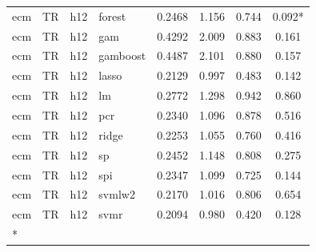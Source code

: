 \begin{ThreePartTable}
\begin{longtable}[t]{llclcccc}
ecm & TR & h12 & forest & 0.2468 & 1.156 & 0.744 & 0.092*\\
ecm & TR & h12 & gam & 0.4292 & 2.009 & 0.883 & 0.161\\
ecm & TR & h12 & gamboost & 0.4487 & 2.101 & 0.880 & 0.157\\
ecm & TR & h12 & lasso & 0.2129 & 0.997 & 0.483 & 0.142\\
ecm & TR & h12 & lm & 0.2772 & 1.298 & 0.942 & 0.860\\
ecm & TR & h12 & pcr & 0.2340 & 1.096 & 0.878 & 0.516\\
ecm & TR & h12 & ridge & 0.2253 & 1.055 & 0.760 & 0.416\\
ecm & TR & h12 & sp & 0.2452 & 1.148 & 0.808 & 0.275\\
ecm & TR & h12 & spi & 0.2347 & 1.099 & 0.725 & 0.144\\
ecm & TR & h12 & svmlw2 & 0.2170 & 1.016 & 0.806 & 0.654\\
ecm & TR & h12 & svmr & 0.2094 & 0.980 & 0.420 & 0.128\\*
\end{longtable}
\end{ThreePartTable}
\endgroup{}
